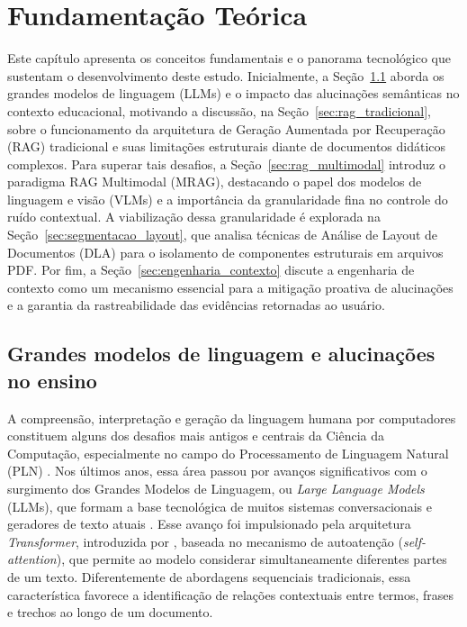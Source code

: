 \chapter{Fundamentação Teórica}
\label{cap:fundamentacao-teorica}

Este capítulo apresenta os conceitos fundamentais e o panorama tecnológico que sustentam o desenvolvimento deste estudo. Inicialmente, a Seção~\ref{sec:llms_e_alucinacoes} aborda os grandes modelos de linguagem (LLMs) e o impacto das alucinações semânticas no contexto educacional, motivando a discussão, na Seção~\ref{sec:rag_tradicional}, sobre o funcionamento da arquitetura de Geração Aumentada por Recuperação (RAG) tradicional e suas limitações estruturais diante de documentos didáticos complexos. Para superar tais desafios, a Seção~\ref{sec:rag_multimodal} introduz o paradigma RAG Multimodal (MRAG), destacando o papel dos modelos de linguagem e visão (VLMs) e a importância da granularidade fina no controle do ruído contextual. A viabilização dessa granularidade é explorada na Seção~\ref{sec:segmentacao_layout}, que analisa técnicas de Análise de Layout de Documentos (DLA) para o isolamento de componentes estruturais em arquivos PDF. Por fim, a Seção~\ref{sec:engenharia_contexto} discute a engenharia de contexto como um mecanismo essencial para a mitigação proativa de alucinações e a garantia da rastreabilidade das evidências retornadas ao usuário.

\section{Grandes modelos de linguagem e alucinações no ensino}
\label{sec:llms_e_alucinacoes}

A compreensão, interpretação e geração da linguagem humana por computadores constituem alguns dos desafios mais antigos e centrais da Ciência da Computação, especialmente no campo do Processamento de Linguagem Natural (PLN) . Nos últimos anos, essa área passou por avanços significativos com o surgimento dos Grandes Modelos de Linguagem, ou \textit{Large Language Models} (LLMs), que formam a base tecnológica de muitos sistemas conversacionais e geradores de texto atuais . Esse avanço foi impulsionado pela arquitetura \textit{Transformer}, introduzida por , baseada no mecanismo de autoatenção (\textit{self-attention}), que permite ao modelo considerar simultaneamente diferentes partes de um texto. Diferentemente de abordagens sequenciais tradicionais, essa característica favorece a identificação de relações contextuais entre termos, frases e trechos ao longo de um documento.

